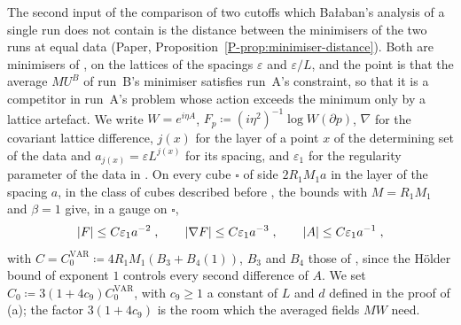 \documentclass[11pt]{preprint}
\DeclarePairedDelimiter{\abs}{\lvert}{\rvert}
\numberwithin{equation}{section}
\theoremstyle{definition}
\theoremstyle{remark}
\theoremstyle{plain}
\begin{document}
The second input of the comparison of two cutoffs which Ba{\l}aban's analysis of a single run does not contain is the distance between the minimisers of the two runs at equal data (Paper, Proposition~\ref{P-prop:minimiser-distance}). Both are minimisers of \cite[Theorem~1, p.~279]{BalabanVAR}, on the lattices of the spacings $\varepsilon$ and $\varepsilon/L$, and the point is that the average $MU^B$ of run~B's minimiser satisfies run~A's constraint, so that it is a competitor in run~A's problem whose action exceeds the minimum only by a lattice artefact. We write $W = e^{i\eta A}$, $F_p \coloneqq (i\eta^2)^{-1}\log W(\partial p)$, $\nabla$ for the covariant lattice difference, $j(x)$ for the layer of a point $x$ of the determining set of the data and $a_{j(x)} = \varepsilon L^{j(x)}$ for its spacing, and $\varepsilon_1$ for the regularity parameter of the data in \cite[(7)]{BalabanVAR}. On every cube $\square$ of side $2R_1M_1a$ in the layer of the spacing $a$, in the class of cubes described before \cite[Theorem~1, p.~279]{BalabanVAR}, the bounds \cite[(9), (10), p.~279]{BalabanVAR} with $M = R_1M_1$ and $\beta = 1$ give, in a gauge on $\square$,
\begin{equation}\label{eq:minimiser-regularity}
    \abs F \leq C\varepsilon_1a^{-2}\;,
    \qquad
    \abs{\nabla F} \leq C\varepsilon_1a^{-3}\;,
    \qquad
    \abs A \leq C\varepsilon_1a^{-1}\;,
\end{equation}
with $C = C^{\mathrm{VAR}}_0 \coloneqq 4R_1M_1(B_3 + B_4(1))$, $B_3$ and $B_4$ those of \cite[Theorem~1]{BalabanVAR}, since the H\"older bound of exponent $1$ controls every second difference of $A$. We set $C_0 \coloneqq 3(1 + 4c_9)C^{\mathrm{VAR}}_0$, with $c_9 \geq 1$ a constant of $L$ and $d$ defined in the proof of (a); the factor $3(1 + 4c_9)$ is the room which the averaged fields $MW$ need.
\end{document}

